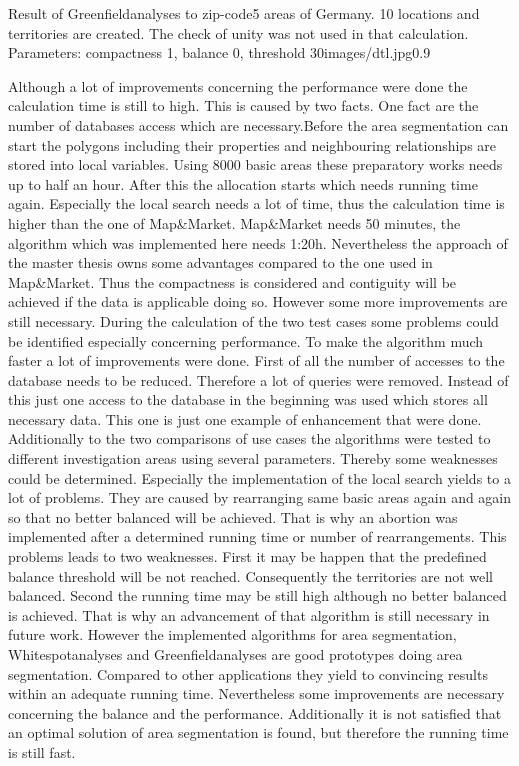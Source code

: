 \begin{figurevarSize}{Result of Greenfieldanalyses to zip-code5 areas of Germany. 10 locations and territories are created. The check of unity was not used in that calculation. Parameters: compactness 1, balance 0, threshold 30}{images/dtl.jpg}{0.9}\end{figurevarSize}

Although a lot of improvements concerning the performance were done the calculation time is still to high. This is caused by two facts. One fact are the number of databases access which are necessary.Before the area segmentation can start the polygons including their properties and neighbouring relationships are stored into local variables. Using 8000 basic areas these preparatory works needs up to half an hour. After this the allocation starts which needs running time again. Especially the local search needs a lot of time, thus the calculation time is higher than the one of Map\&Market. Map\&Market needs 50 minutes, the algorithm which was implemented here needs 1:20h. Nevertheless the approach of the master thesis owns some advantages compared to the one used in Map\&Market. Thus the compactness is considered and contiguity will be achieved if the data is applicable doing so. However some more improvements are still necessary. During the calculation of the two test cases some problems could be identified especially concerning performance. To make the algorithm much faster a lot of improvements were done. First of all the number of accesses to the database needs to be reduced. Therefore a lot of queries were removed. Instead of this just one access to the database in the beginning was used which stores all necessary data. This one is just one example of enhancement that were done. \\
Additionally to the two comparisons of use cases the algorithms were tested to different investigation areas using several parameters. Thereby some weaknesses could be determined. Especially the implementation of the local search yields to a lot of problems. They are caused by rearranging same basic areas again and again so that no better balanced will be achieved. That is why an abortion was implemented after a determined running time or number of rearrangements. This problems leads to two weaknesses. First it may be happen that the predefined balance threshold will be not reached. Consequently the territories are not well balanced. Second the running time may be still high although no better balanced is achieved. That is why an advancement of that algorithm is still necessary in future work. However the implemented algorithms for area segmentation, Whitespotanalyses and Greenfieldanalyses are good prototypes doing area segmentation. Compared to other applications they yield to convincing results within an adequate running time. Nevertheless some improvements are necessary concerning the balance and the performance. Additionally it is not satisfied that an optimal solution of area segmentation is found, but therefore the running time is still fast. 

